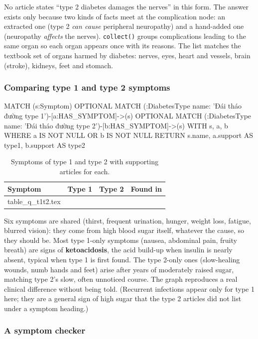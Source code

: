 \documentclass[11pt, a4paper]{article}
\makeatletter
\newcommand{\tabinput}[1]{\@@input #1 }   %
\newcommand{\code}[1]{\texttt{#1}}
\makeatother
\begin{document}
No article states ``type 2 diabetes damages the nerves'' in this form. The answer exists only because two kinds of facts meet at the complication node: an extracted one (type 2 \emph{can cause} peripheral neuropathy) and a hand-added one (neuropathy \emph{affects} the nerves). \code{collect()} groups complications leading to the same organ so each organ appears once with its reasons. The list matches the textbook set of organs harmed by diabetes: nerves, eyes, heart and vessels, brain (stroke), kidneys, feet and stomach.

\subsubsection{Comparing type 1 and type 2 symptoms}

\begin{codeblock}
MATCH (s:Symptom)
OPTIONAL MATCH (:DiabetesType {name: 'Đái tháo đường type 1'})-[a:HAS_SYMPTOM]->(s)
OPTIONAL MATCH (:DiabetesType {name: 'Đái tháo đường type 2'})-[b:HAS_SYMPTOM]->(s)
WITH s, a, b WHERE a IS NOT NULL OR b IS NOT NULL
RETURN s.name, a.support AS type1, b.support AS type2
\end{codeblock}

\begin{table}[H]
\centering
\small
\caption{Symptoms of type 1 and type 2 with supporting articles for each.}
\label{tab:q-t1t2}
\begin{tabular}{l r r l}
\toprule
Symptom & Type 1 & Type 2 & Found in \\
\midrule
\tabinput{table_q_t1t2.tex}
\bottomrule
\end{tabular}
\end{table}

Six symptoms are shared (thirst, frequent urination, hunger, weight loss, fatigue, blurred vision): they come from high blood sugar itself, whatever the cause, so they should be. Most type 1-only symptoms (nausea, abdominal pain, fruity breath) are signs of \textbf{ketoacidosis}, the acid build-up when insulin is nearly absent, typical when type 1 is first found. The type 2-only ones (slow-healing wounds, numb hands and feet) arise after years of moderately raised sugar, matching type 2's slow, often unnoticed course. The graph reproduces a real clinical difference without being told. (Recurrent infections appear only for type 1 here; they are a general sign of high sugar that the type 2 articles did not list under a symptom heading.)

\subsubsection{A symptom checker}
\end{document}
